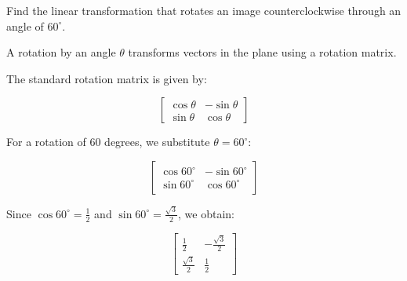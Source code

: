         \begin{problem}
Find the linear transformation that rotates an image counterclockwise through an angle of $60^\circ$.

    \vspace{0.3cm}

    A rotation by an angle $\theta$ transforms vectors in the plane using a rotation matrix.

     The standard rotation matrix is given by:

\[
\begin{bmatrix}
\cos\theta & -\sin\theta \\
\sin\theta & \cos\theta
\end{bmatrix}
\]

\vspace{0.3cm}

For a rotation of 60 degrees, we substitute $\theta = 60^\circ$:

\[
\begin{bmatrix}
\cos 60^\circ & -\sin 60^\circ \\
\sin 60^\circ & \cos 60^\circ
\end{bmatrix}
\]

\vspace{0.3cm}

Since $\cos 60^\circ = \frac{1}{2}$ and $\sin 60^\circ = \frac{\sqrt{3}}{2}$, we obtain:

\[
\begin{bmatrix}
\frac{1}{2} & -\frac{\sqrt{3}}{2} \\
\frac{\sqrt{3}}{2} & \frac{1}{2}
\end{bmatrix}
\]

\end{problem}

       \vspace{0.5cm}

